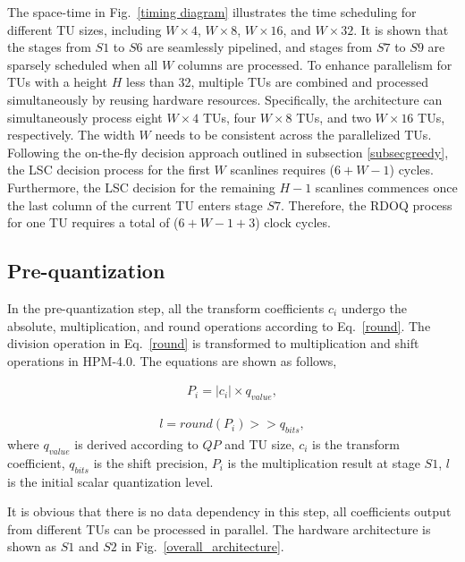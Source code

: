\documentclass[lettersize,journal]{IEEEtran}
\begin{document}
The space-time in Fig.~\ref{timing diagram} illustrates the time scheduling for different TU sizes, including $W\times4$, $W\times8$, $W\times16$, and $W\times32$. It is shown that the stages from $S1$ to $S6$ are seamlessly pipelined, and stages from $S7$ to $S9$ are sparsely scheduled when all $W$ columns are processed. 
To enhance parallelism for TUs with a height $H$ less than 32, multiple TUs are combined and processed simultaneously by reusing hardware resources. Specifically, the architecture can simultaneously process eight $W\times4$ TUs, four $W\times8$ TUs, and two $W\times16$ TUs, respectively. The width $W$ needs to be consistent across the parallelized TUs. 
Following the on-the-fly decision approach outlined in subsection \ref{subsecgreedy}, the LSC decision process for the first $W$ scanlines requires ($6 + W - 1$) cycles. Furthermore, the LSC decision for the remaining $H-1$ scanlines commences once the last column of the current TU enters stage $S7$. Therefore, the RDOQ process for one TU requires a total of ($6 + W - 1 + 3$) clock cycles. 

\subsection{Pre-quantization}
In the pre-quantization step, all the transform coefficients $c_{i}$ undergo the absolute, multiplication, and round operations according to Eq.~\eqref{round}. The division operation in Eq.~\eqref{round} is transformed to multiplication and shift operations in HPM-4.0. The equations are shown as follows,

\begin{equation}\label{Qp}
	\begin{aligned}
		P_{i} = \lvert c_{i} \rvert \times q_{value},
	\end{aligned}
\end{equation}

\begin{equation}\label{l}
	\begin{aligned}
		l = round \left ( P_{i} \right ) >> q_{bits},
	\end{aligned}
\end{equation}
where $q_{value}$ is derived according to $QP$ and TU size, $c_{i}$ is the transform coefficient, $q_{bits}$ is the shift precision, $P_{i}$ is the multiplication result at stage $S1$, $l$ is the initial scalar quantization level.

It is obvious that there is no data dependency in this step, all coefficients output from different TUs can be processed in parallel. The hardware architecture is shown as $S1$ and $S2$ in Fig.~\ref{overall_architecture}. 
\end{document}
